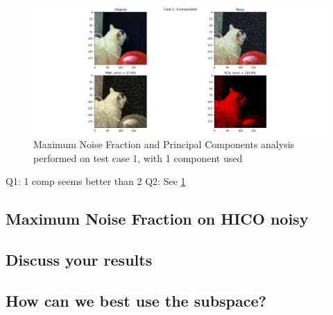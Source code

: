 \begin{figure}
    \centering
    \includegraphics[width=\textwidth]{../fig/task_3_case_1_P_1}
    \caption{Maximum Noise Fraction and Principal Components analysis performed on test case 1, with 1 component used}
    \label{fig:mnf_test}
\end{figure}

Q1: 1 comp seems better than 2
Q2: See \cref{fig:mnf_test}

\subsection{Maximum Noise Fraction on HICO noisy}

\subsection{Discuss your results}

\subsection{How can we best use the subspace?}

